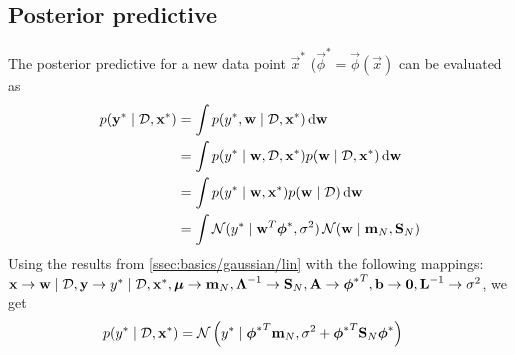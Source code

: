 \subsection{Posterior predictive}
The posterior predictive for a new data point $\vec x^\ast$ ($\vec \phi^\ast = \vec \phi(\vec x)$ can be evaluated as
\begin{align}
	p(\vec y^\ast \given \mathcal D, \vec x^\ast)	&= \int p(y^\ast, \vec w \given \mathcal D, \vec x^\ast)\,\mathrm d\vec w \\
													&= \int p(y^\ast \given \vec w, \mathcal D, \vec x^\ast) p(\vec w \given \mathcal D, \vec x^\ast)\,\mathrm d\vec w \\
													&= \int p(y^\ast \given \vec w, \vec x^\ast) p(\vec w \given \mathcal D)\,\mathrm d\vec w \\
													&= \int \Gauss(y^\ast \given \vec w^T \vec \phi^\ast, \sigma^2) \Gauss(\vec w \given \vec m_N, \vec S_N)
\end{align}
Using the results from \ref{ssec:basics/gaussian/lin} with the following mappings: $\vec x \to \vec w \given \mathcal D, \vec y \to y^\ast \given \mathcal D, \vec x^\ast, \vec \mu \to \vec m_N, \vec \Lambda^{-1} \to \vec S_N, \vec A \to {\vec \phi^\ast}^T, \vec b \to \vec 0, \vec L^{-1} \to \sigma^2$, we get
\begin{align}
	p(y^\ast \given \mathcal D, \vec x^\ast)	&= \Gauss\left(y^\ast \given {\vec\phi^\ast}^T \vec m_N, \sigma^2 + {\vec\phi^\ast}^T \vec S_N \vec\phi^\ast\right)
\end{align}

